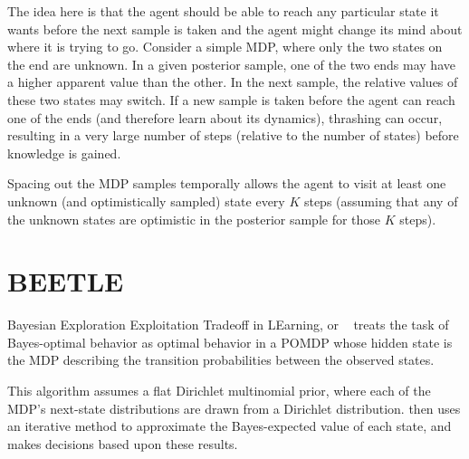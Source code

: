The idea here is that the agent should be able to reach any particular state it wants before the next sample is taken and the agent might change its mind about where it is trying to go. Consider a simple  MDP, where only the two states on the end are unknown. In a given posterior sample, one of the two ends may have a higher apparent value than the other. In the next sample, the relative values of these two states may switch. If a new sample is taken before the agent can reach one of the ends (and therefore learn about its dynamics), thrashing  can occur, resulting in a very large number of steps (relative to the number of states) before knowledge is gained.

Spacing out the MDP samples temporally allows the agent to visit at least one unknown (and optimistically sampled) state every $K$ steps (assuming that any of the unknown states are optimistic in the posterior sample for those $K$ steps). 



\section{BEETLE}

Bayesian Exploration Exploitation Tradeoff in LEarning, or ~\cite{poupart06} treats the task of Bayes-optimal behavior as optimal behavior in a POMDP whose hidden state is the MDP describing the transition probabilities between the observed states.

This algorithm assumes a flat Dirichlet multinomial prior, where each of the MDP's next-state distributions are drawn from a Dirichlet distribution.  then uses an iterative method  to approximate the Bayes-expected value of each state, and makes decisions based upon these results. 




